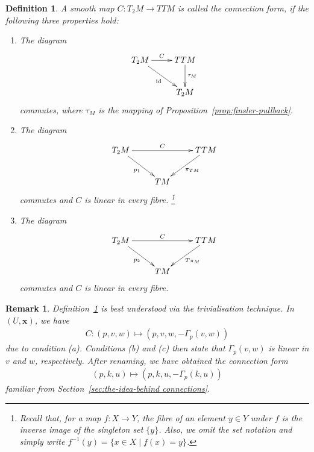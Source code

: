 \documentclass[11pt,a4paper,twoside,openany]{report}
\theoremstyle{my-theorem}
\theoremstyle{non-theorem}
\newtheorem{definition}[theorem]{Definition}
\newtheorem{remark}[theorem]{Remark}
\begin{document}
			\begin{definition}
				\label{def:connection-form}
				A smooth map $C: T_2M \to TTM$ is called the \emph{connection form}, if the following three properties hold:
				\begin{enumerate}[label=\rm(\alph*)]
					\item The diagram
					\begin{align*}
						\xymatrix{
							T_2M \ar[rd]_-{\id} \ar[r]^-{C} &
							TTM \ar[d]^-{\tau_M}\\
							& T_2M}
					\end{align*}
					commutes, where $\tau_M$ is the mapping of Proposition~\ref{prop:finsler-pullback}.
					
					\item The diagram
					\begin{align*}
						\xymatrix{
							T_2M \ar[rd]_-{p_1} \ar[rr]^-{C} &&
							TTM \ar[ld]^-{\pi_{TM}}\\
							& TM &}
					\end{align*}
					commutes and $C$ is linear in every fibre.%
						\footnote{Recall that, for a map $f: X \to Y$, the \emph{fibre} of an element $y \in Y$ under $f$ is the inverse image of the singleton set $\{y\}$. Also, we omit the set notation and simply write $f^{-1}(y) = \{x \in X \mid f(x) = y\}$.}
					
					\item The diagram
					\begin{align*}
						\xymatrix{
							T_2M \ar[rd]_-{p_2} \ar[rr]^-{C} &&
							TTM \ar[ld]^-{T\pi_{M}}\\
							& TM &}
					\end{align*}
					commutes and $C$ is linear in every fibre.
				\end{enumerate}
			\end{definition}
		
			\begin{remark}
				Definition~\ref{def:connection-form} is best understood via the trivialisation technique. In $(U,\mathbf x)$, we have
				\begin{align*}
					C: (p,v,w) \mapsto (p,v,w,-\Gamma_p(v,w))
				\end{align*}
				due to condition (a). Conditions (b) and (c) then state that $\Gamma_p(v,w)$ is linear in $v$ and $w$, respectively. After renaming, we have obtained the connection form
				\begin{align*}
					(p,k,u) \mapsto (p,k,u,-\Gamma_p(k,u))
				\end{align*}
				familiar from Section~\ref{sec:the-idea-behind connections}.
			\end{remark}
		
\end{document}
